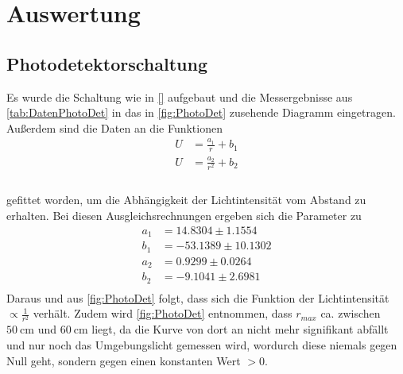 \section{Auswertung}
\label{sec:Auswertung}
\subsection{Photodetektorschaltung}
\label{subsec:PhotDet}
Es wurde die Schaltung wie in \autoref{} aufgebaut und die Messergebnisse aus \autoref{tab:DatenPhotoDet} in das in \autoref{fig:PhotoDet} zusehende Diagramm eingetragen.
Außerdem sind die Daten an die Funktionen
\begin{align*}
    U &= \frac{a_1}{r} + b_1\\
    U &= \frac{a_2}{r^2} + b_2\\
\end{align*}
\\
gefittet worden, um die Abhängigkeit der Lichtintensität vom Abstand zu erhalten. Bei diesen Ausgleichsrechnungen ergeben sich die Parameter zu
\begin{align*}
  a_1 &= 14.8304\pm 1.1554\\
  b_1 &= -53.1389\pm 10.1302\\
  a_2 &= 0.9299\pm 0.0264\\
  b_2 &= -9.1041\pm 2.6981\\
\end{align*}
Daraus und aus \autoref{fig:PhotoDet} folgt, dass sich die Funktion der Lichtintensität $\varpropto \frac{1}{r^2}$ verhält. Zudem wird \autoref{fig:PhotoDet}
entnommen, dass $r_{max}$ ca. zwischen $\SI{50}{\centi\meter}$ und $\SI{60}{\centi\meter}$ liegt, da die Kurve von dort an nicht mehr signifikant abfällt und nur noch
das Umgebungslicht gemessen wird, wordurch diese niemals gegen Null geht, sondern gegen einen konstanten Wert $>0$.

